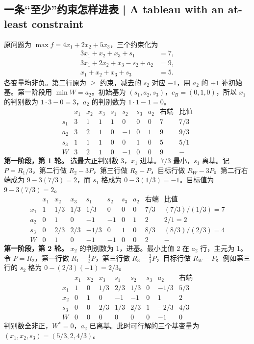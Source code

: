 \documentclass[UTF8,11pt,a4paper]{ctexart}
\begin{document}
\subsection{一条“至少”约束怎样进表 | A tableau with an at-least constraint}
原问题为 $\max f=4x_1+2x_2+5x_3$，三个约束化为
\[
\begin{aligned}
 3x_1+x_2+x_3+s_1&=7,\\
 3x_1+2x_2+x_3-s_2+a_2&=9,\\
 x_1+x_2+x_3+s_3&=5.
\end{aligned}
\]
各变量均非负。第二行原为 $\ge$ 约束，减去的 $s_2$ 对应 $-1$，用 $a_2$ 的 $+1$ 补初始基。第一阶段用 $\min W=a_2$。初始基为 $(s_1,a_2,s_3)$，$c_B=(0,1,0)$，所以 $x_1$ 的判别数为 $1\cdot3-0=3$，$a_2$ 的判别数为 $1\cdot1-1=0$。
\[
\begin{array}{c|rrrrrrr|r|c}
&x_1&x_2&x_3&s_1&s_2&s_3&a_2&\text{右端}&\text{比值}\\\hline
s_1&\boxed{3}&1&1&1&0&0&0&7&7/3\\
a_2&3&2&1&0&-1&0&1&9&9/3\\
s_3&1&1&1&0&0&1&0&5&5/1\\\hline
W&3&2&1&0&-1&0&0&9&-
\end{array}
\]
\textbf{第一阶段，第 1 轮。} 选最大正判别数 3，$x_1$ 进基。$7/3$ 最小，$s_1$ 离基。记 $P=R_1/3$，第二行做 $R_2-3P$，第三行做 $R_3-P$，目标行做 $R_W-3P$。第二行右端成为 $9-3(7/3)=2$，而 $s_1$ 格成为 $0-3(1/3)=-1$。目标值为 $9-3(7/3)=2$。
\[
\begin{array}{c|rrrrrrr|r|c}
&x_1&x_2&x_3&s_1&s_2&s_3&a_2&\text{右端}&\text{比值}\\\hline
x_1&1&1/3&1/3&1/3&0&0&0&7/3&(7/3)/(1/3)=7\\
a_2&0&\boxed{1}&0&-1&-1&0&1&2&2/1=2\\
s_3&0&2/3&2/3&-1/3&0&1&0&8/3&(8/3)/(2/3)=4\\\hline
W&0&1&0&-1&-1&0&0&2&-
\end{array}
\]
\textbf{第一阶段，第 2 轮。} $x_2$ 的判别数为 1，进基。最小比值 2 在 $a_2$ 行，主元为 1。令 $P=R_2$，第一行做 $R_1-\tfrac13 P$，第三行做 $R_3-\tfrac23 P$，目标行做 $R_W-P$。例如第三行的 $s_2$ 格为 $0-(2/3)(-1)=2/3$。
\[
\begin{array}{c|rrrrrrr|r}
&x_1&x_2&x_3&s_1&s_2&s_3&a_2&\text{右端}\\\hline
x_1&1&0&1/3&2/3&1/3&0&-1/3&5/3\\
x_2&0&1&0&-1&-1&0&1&2\\
s_3&0&0&2/3&1/3&2/3&1&-2/3&4/3\\\hline
W&0&0&0&0&0&0&-1&0
\end{array}
\]
判别数全非正，$W^*=0$，$a_2$ 已离基。此时可行解的三个基变量为 $(x_1,x_2,s_3)=(5/3,2,4/3)$。
\end{document}
